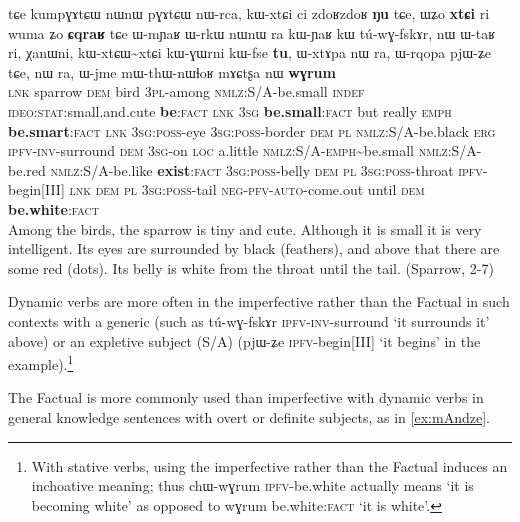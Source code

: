 \documentclass[oldfontcommands,oneside,a4paper,11pt]{article}
\newcommand{\ipa}[1]{{\phon \mbox{#1}}} %
\newcommand{\factual}[1]{\textsc{:fact}}
\begin{document}
\begin{exe}
\ex \label{ex:kumpGAtCW}
\gll
\ipa{tɕe} 	\ipa{kumpɣɤtɕɯ} 	\ipa{nɯnɯ} 	\ipa{pɣɤtɕɯ} 	\ipa{nɯ-rca,} 
 \ipa{kɯ-xtɕi} 	\ipa{ci} 	\ipa{zdoʁzdoʁ} 	\ipa{\textbf{ŋu}} 	\ipa{tɕe,}  \ipa{ɯʑo} 	\ipa{\textbf{xtɕi}} 	\ipa{ri} 	\ipa{wuma} 	\ipa{ʑo} 	\ipa{\textbf{ɕqraʁ}} \ipa{tɕe}  	\ipa{ɯ-mɲaʁ} 	\ipa{ɯ-rkɯ} 	\ipa{nɯnɯ} 	\ipa{ra} \ipa{kɯ-ɲaʁ} 	\ipa{kɯ} 	\ipa{tú-wɣ-fskɤr,} 	 	\ipa{nɯ} 	\ipa{ɯ-taʁ} 	\ipa{ri,} 	\ipa{χanɯni,} 	\ipa{kɯ-xtɕɯ\textasciitilde{}xtɕi} 	\ipa{kɯ-ɣɯrni} 	\ipa{kɯ-fse} 	\ipa{\textbf{tu},}  	\ipa{ɯ-xtɤpa} 	\ipa{nɯ} \ipa{ra,} 	\ipa{ɯ-rqopa} 	\ipa{pjɯ-ʑe} 	\ipa{tɕe,} 	\ipa{nɯ} \ipa{ra,}  \ipa{ɯ-jme} 	\ipa{mɯ-thɯ-nɯɬoʁ} 	\ipa{mɤɕtʂa} 	\ipa{nɯ} 	\ipa{\textbf{wɣrum}} \\
\textsc{lnk} sparrow \textsc{dem} bird \textsc{3pl}-among \textsc{nmlz}:S/A-be.small \textsc{indef} \textsc{ideo:stat}:small.and.cute \textbf{be}\factual{} \textsc{lnk}  \textsc{3sg} \textbf{be.small}\factual{} but really \textsc{emph} \textbf{be.smart}\factual{}  \textsc{lnk}  \textsc{3sg:poss}-eye \textsc{3sg:poss}-border \textsc{dem}  \textsc{pl}  \textsc{nmlz}:S/A-be.black \textsc{erg} \textsc{ipfv-inv}-surround \textsc{dem} \textsc{3sg}-on \textsc{loc} a.little \textsc{nmlz}:S/A-\textsc{emph}\textasciitilde{}be.small \textsc{nmlz}:S/A-be.red \textsc{nmlz}:S/A-be.like \textbf{exist}\factual{} \textsc{3sg:poss}-belly \textsc{dem}  \textsc{pl}  \textsc{3sg:poss}-throat \textsc{ipfv}-begin[III] \textsc{lnk}   \textsc{dem}  \textsc{pl}  \textsc{3sg:poss}-tail \textsc{neg-pfv-auto}-come.out until \textsc{dem} \textbf{be.white}\factual{} \\
\glt Among the birds, the sparrow is tiny and cute. Although it is small it is very intelligent. Its eyes are surrounded by black (feathers), and above that there are some red (dots). Its belly is white from the throat until the tail. (Sparrow, 2-7)
\end{exe}

 Dynamic verbs are more often in the imperfective rather than the Factual in such contexts with a generic (such as \ipa{tú-wɣ-fskɤr}  \textsc{ipfv-inv}-surround  `it surrounds it' above)  or an expletive subject (S/A) (\ipa{pjɯ-ʑe} \textsc{ipfv}-begin[III] `it begins' in the example).\footnote{With stative verbs, using the imperfective rather than the Factual induces an inchoative meaning; thus \ipa{chɯ-wɣrum} \textsc{ipfv}-be.white actually means `it is becoming white' as opposed to \ipa{wɣrum} be.white\factual{} `it is white'.}
 
 The Factual is more commonly used than imperfective with dynamic verbs in general knowledge sentences with overt or definite subjects, as in \ref{ex:mAndze}.  
\end{document}
